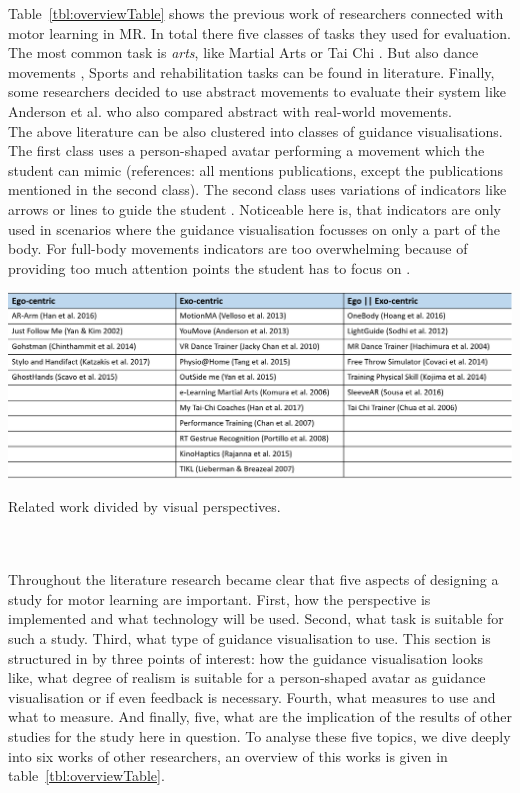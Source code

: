 Table~\ref{tbl:overviewTable} shows the previous work of researchers connected with motor learning in MR. In total there five classes of tasks they used for evaluation. The most common task is \textit{arts}, like Martial Arts or Tai Chi \cite{Han2016, Yang2002, Katzakis2017, Han2017, Portillo2008, Hoang2016, Chua2003, Komura2006}. But also dance movements \cite{Anderson2013a, Yan2015, Chan2010, Chan2007, Hachimura2004}, Sports \cite{Covaci2014, Kojima2014} and rehabilitation tasks \cite{Velloso2013, Chinthammit2014, Tang2015, Rajanna2015, Sousa2016} can be found in literature. Finally, some researchers decided to use abstract movements \cite{Sodhi2012, Lieberman2007} to evaluate their system like Anderson et al. \cite{Anderson2013a} who also compared abstract with real-world movements.\\
The above literature can be also clustered into classes of guidance visualisations. The first class uses a person-shaped avatar performing a movement which the student can mimic (references: all mentions publications, except the publications mentioned in the second class). The second class uses variations of indicators like arrows or lines to guide the student \cite{Katzakis2017, Tang2015, Sodhi2012, Covaci2014, Sousa2016}. Noticeable here is, that indicators are only used in scenarios where the guidance visualisation focusses on only a part of the body. For full-body movements indicators are too overwhelming because of providing too much attention points the student has to focus on \cite{Sodhi2012}.
\begin{table}
	\centering
	\includegraphics[width=1.0\textwidth]{img/overview_table.png}
	\caption{Related work divided by visual perspectives.}
	\label{tbl:overviewTable}
\end{table}\\ $ $\\
Throughout the literature research became clear that five aspects of designing a study for motor learning are important. First, how the perspective is implemented and what technology will be used. Second, what task is suitable for such a study. Third, what type of guidance visualisation to use. This section is structured in by three points of interest: how the guidance visualisation looks like, what degree of realism is suitable for a person-shaped avatar as guidance visualisation or if even feedback is necessary. Fourth, what measures to use and what to measure. And finally, five, what are the implication of the results of other studies for the study here in question. To analyse these five topics, we dive deeply into six works of other researchers, an overview of this works is given in table~\ref{tbl:overviewTable}.
